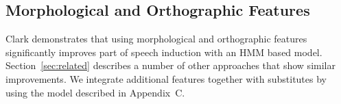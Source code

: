 \subsection{Morphological and Orthographic Features}
\label{sec:feat}

Clark  demonstrates that
using morphological and orthographic features significantly improves
part of speech induction with an HMM based model.
Section~\ref{sec:related} describes a number of other approaches that
show similar improvements.  We integrate additional features together
with substitutes by using the model described in Appendix~C.





